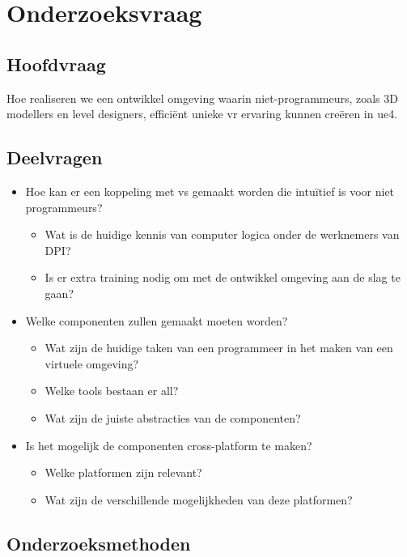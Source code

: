 \section{Onderzoeksvraag}

\subsection{Hoofdvraag}

Hoe realiseren we een ontwikkel omgeving waarin niet-programmeurs, zoals 3D modellers en level designers, efficiënt unieke \gls{vr} ervaring kunnen creëren in \gls{ue4}.

\subsection{Deelvragen}

\begin{itemize}  
\item Hoe kan er een koppeling met \gls{vs} gemaakt worden die intuïtief is voor niet programmeurs? 
	\begin{itemize}
	\item Wat is de huidige kennis van computer logica onder de werknemers van DPI?
	\item Is er extra training nodig om met de ontwikkel omgeving aan de slag te gaan?
	\end{itemize}
\item Welke componenten zullen gemaakt moeten worden?
	\begin{itemize}
	\item Wat zijn de huidige taken van een programmeer in het maken van een virtuele omgeving?
	\item Welke tools bestaan er all?
	\item Wat zijn de juiste abstracties van de componenten? 
	\end{itemize}
\item Is het mogelijk de componenten cross-platform te maken?
	\begin{itemize}
	\item Welke platformen zijn relevant?
	\item Wat zijn de verschillende mogelijkheden van deze platformen?
	\end{itemize}
\end{itemize}

\subsection{Onderzoeksmethoden}
\label{subsec:onderzoeksmethoden}

